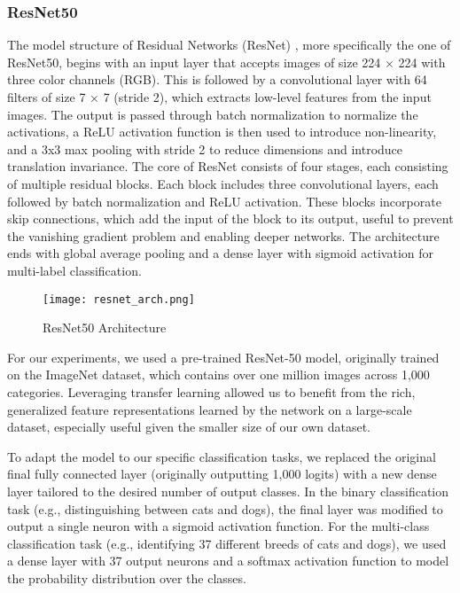 \documentclass{article}
\begin{document}
\subsubsection{ResNet50}
The model structure of Residual Networks (ResNet) \cite{resnet}, more specifically the one of ResNet50, begins with an input layer that accepts images of size 224 × 224 with three color channels (RGB). This is followed by a convolutional layer with 64 filters of size 7 × 7 (stride 2),  which extracts low-level features from the input images. The output is passed through batch normalization to normalize the activations, a ReLU activation function is then used to introduce non-linearity, and a 3x3 max pooling with stride 2 to reduce dimensions and introduce translation invariance. The core of ResNet consists of four stages, each consisting of multiple residual blocks. Each block includes three convolutional layers, each followed by batch normalization and ReLU activation. These blocks incorporate skip connections, which add the input of the block to its output, useful to prevent the vanishing gradient problem and enabling deeper networks. The architecture ends with global average pooling and a dense layer with sigmoid activation for multi-label classification.

\begin{figure}[h]
    \centering
    \texttt{[image: resnet\_arch.png]}
    \caption{ResNet50 Architecture}
    \label{fig:resnet_architecture}
\end{figure}

For our experiments, we used a pre-trained ResNet-50 model, originally trained on the ImageNet dataset, which contains over one million images across 1,000 categories. Leveraging transfer learning allowed us to benefit from the rich, generalized feature representations learned by the network on a large-scale dataset, especially useful given the smaller size of our own dataset.

To adapt the model to our specific classification tasks, we replaced the original final fully connected layer (originally outputting 1,000 logits) with a new dense layer tailored to the desired number of output classes. In the binary classification task (e.g., distinguishing between cats and dogs), the final layer was modified to output a single neuron with a sigmoid activation function. For the multi-class classification task (e.g., identifying 37 different breeds of cats and dogs), we used a dense layer with 37 output neurons and a softmax activation function to model the probability distribution over the classes.
\end{document}
